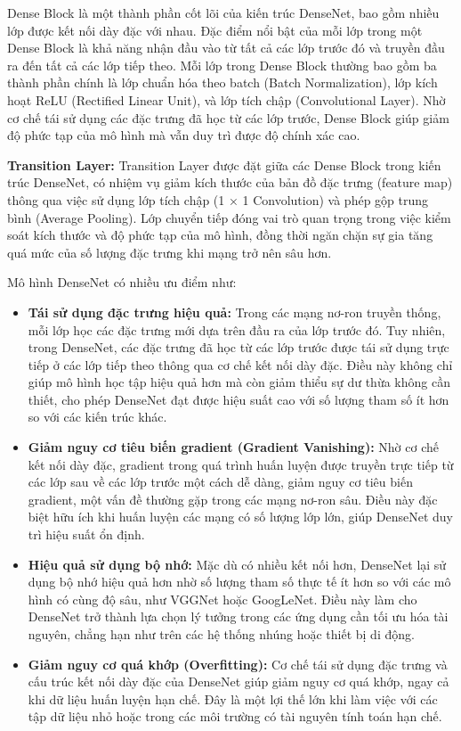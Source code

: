 \documentclass[
]{article}
\begin{document}
Dense Block là một thành phần cốt lõi của kiến trúc DenseNet, bao gồm
nhiều lớp được kết nối dày đặc với nhau. Đặc điểm nổi bật của mỗi lớp
trong một Dense Block là khả năng nhận đầu vào từ tất cả các lớp trước
đó và truyền đầu ra đến tất cả các lớp tiếp theo. Mỗi lớp trong Dense
Block thường bao gồm ba thành phần chính là lớp chuẩn hóa theo batch
(Batch Normalization), lớp kích hoạt ReLU (Rectified Linear Unit), và
lớp tích chập (Convolutional Layer). Nhờ cơ chế tái sử dụng các đặc
trưng đã học từ các lớp trước, Dense Block giúp giảm độ phức tạp của mô
hình mà vẫn duy trì được độ chính xác cao.

\textbf{Transition Layer:} Transition Layer được đặt giữa các Dense
Block trong kiến trúc DenseNet, có nhiệm vụ giảm kích thước của bản đồ
đặc trưng (feature map) thông qua việc sử dụng lớp tích chập (1 × 1
Convolution) và phép gộp trung bình (Average Pooling). Lớp chuyển tiếp
đóng vai trò quan trọng trong việc kiểm soát kích thước và độ phức tạp
của mô hình, đồng thời ngăn chặn sự gia tăng quá mức của số lượng đặc
trưng khi mạng trở nên sâu hơn.

Mô hình DenseNet có nhiều ưu điểm như:

\begin{itemize}
\item
  \textbf{Tái sử dụng đặc trưng hiệu quả:} Trong các mạng nơ-ron truyền
  thống, mỗi lớp học các đặc trưng mới dựa trên đầu ra của lớp trước đó.
  Tuy nhiên, trong DenseNet, các đặc trưng đã học từ các lớp trước được
  tái sử dụng trực tiếp ở các lớp tiếp theo thông qua cơ chế kết nối dày
  đặc. Điều này không chỉ giúp mô hình học tập hiệu quả hơn mà còn giảm
  thiểu sự dư thừa không cần thiết, cho phép DenseNet đạt được hiệu suất
  cao với số lượng tham số ít hơn so với các kiến trúc khác.
\item
  \textbf{Giảm nguy cơ tiêu biến gradient (Gradient Vanishing):} Nhờ cơ
  chế kết nối dày đặc, gradient trong quá trình huấn luyện được truyền
  trực tiếp từ các lớp sau về các lớp trước một cách dễ dàng, giảm nguy
  cơ tiêu biến gradient, một vấn đề thường gặp trong các mạng nơ-ron
  sâu. Điều này đặc biệt hữu ích khi huấn luyện các mạng có số lượng lớp
  lớn, giúp DenseNet duy trì hiệu suất ổn định.
\item
  \textbf{Hiệu quả sử dụng bộ nhớ:} Mặc dù có nhiều kết nối hơn,
  DenseNet lại sử dụng bộ nhớ hiệu quả hơn nhờ số lượng tham số thực tế
  ít hơn so với các mô hình có cùng độ sâu, như VGGNet hoặc GoogLeNet.
  Điều này làm cho DenseNet trở thành lựa chọn lý tưởng trong các ứng
  dụng cần tối ưu hóa tài nguyên, chẳng hạn như trên các hệ thống nhúng
  hoặc thiết bị di động.
\item
  \textbf{Giảm nguy cơ quá khớp (Overfitting):} Cơ chế tái sử dụng đặc
  trưng và cấu trúc kết nối dày đặc của DenseNet giúp giảm nguy cơ quá
  khớp, ngay cả khi dữ liệu huấn luyện hạn chế. Đây là một lợi thế lớn
  khi làm việc với các tập dữ liệu nhỏ hoặc trong các môi trường có tài
  nguyên tính toán hạn chế.
\end{itemize}
\end{document}
